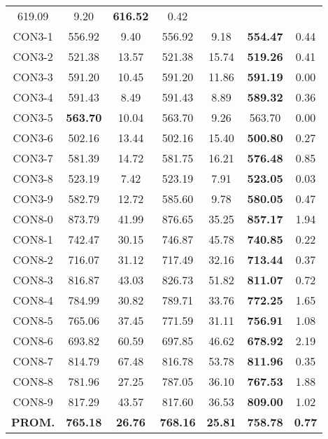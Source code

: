\begin{table}[ht]
\begin{tabular}{c c c c c c c}
619.09 & 9.20 & \bf{616.52} & 
0.42\\CON3-1 & 556.92 & 9.40 & 
556.92 & 9.18 & \bf{554.47} & 
0.44\\CON3-2 & 521.38 & 13.57 & 
521.38 & 15.74 & \bf{519.26} & 
0.41\\CON3-3 & 591.20 & 10.45 & 
591.20 & 11.86 & \bf{591.19} & 
0.00\\CON3-4 & 591.43 & 8.49 & 
591.43 & 8.89 & \bf{589.32} & 
0.36\\CON3-5 & \bf{563.70} & 10.04 & 
563.70 & 9.26 & 563.70 & 0.00\\
CON3-6 & 502.16 & 13.44 & 
502.16 & 15.40 & \bf{500.80} & 
0.27\\CON3-7 & 581.39 & 14.72 & 
581.75 & 16.21 & \bf{576.48} & 
0.85\\CON3-8 & 523.19 & 7.42 & 
523.19 & 7.91 & \bf{523.05} & 
0.03\\CON3-9 & 582.79 & 12.72 & 
585.60 & 9.78 & \bf{580.05} & 
0.47\\CON8-0 & 873.79 & 41.99 & 
876.65 & 35.25 & \bf{857.17} & 
1.94\\CON8-1 & 742.47 & 30.15 & 
746.87 & 45.78 & \bf{740.85} & 
0.22\\CON8-2 & 716.07 & 31.12 & 
717.49 & 32.16 & \bf{713.44} & 
0.37\\CON8-3 & 816.87 & 43.03 & 
826.73 & 51.82 & \bf{811.07} & 
0.72\\CON8-4 & 784.99 & 30.82 & 
789.71 & 33.76 & \bf{772.25} & 
1.65\\CON8-5 & 765.06 & 37.45 & 
771.59 & 31.11 & \bf{756.91} & 
1.08\\CON8-6 & 693.82 & 60.59 & 
697.85 & 46.62 & \bf{678.92} & 
2.19\\CON8-7 & 814.79 & 67.48 & 
816.78 & 53.78 & \bf{811.96} & 
0.35\\CON8-8 & 781.96 & 27.25 & 
787.05 & 36.10 & \bf{767.53} & 
1.88\\CON8-9 & 817.29 & 43.57 & 
817.60 & 36.53 & \bf{809.00} & 
1.02\\\bf{PROM.} & 
\bf{765.18} & \bf{26.76} & \bf{768.16} & \bf{25.81} & \bf{758.78} & \bf{0.77}\\[1ex]\hline
\end{tabular}
\label{table:nonlin}
\end{table} \clearpage
